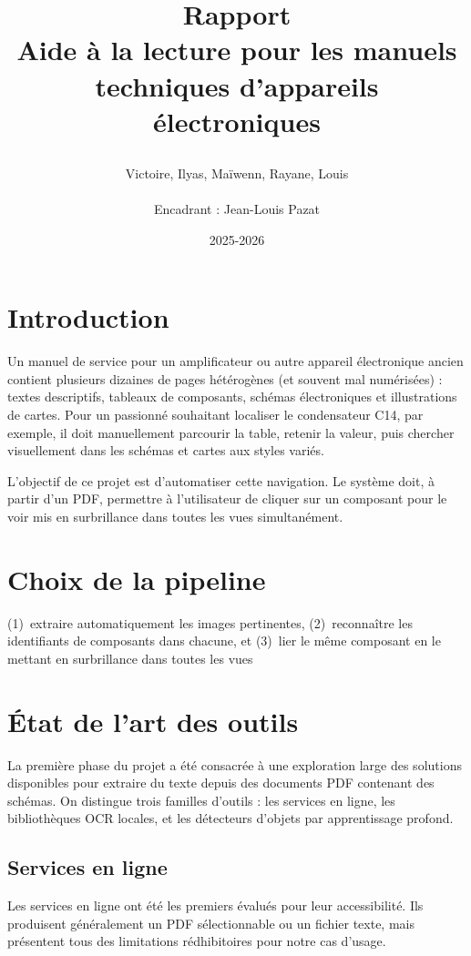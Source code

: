 \documentclass[a4paper,11pt]{article} %
\title{
\begin{center}
{\Huge \textbf{Rapport}} \\[1cm]
{\textbf{} Aide à la lecture pour les manuels techniques d'appareils électroniques}
\end{center}
}
\author{Victoire, Ilyas, Ma\"iwenn, Rayane, Louis 
  \\ \\
  Encadrant : Jean-Louis Pazat}
\date{2025-2026}
\begin{document}
\maketitle

\section*{Introduction}

Un manuel de service pour un amplificateur ou autre appareil électronique ancien contient 
plusieurs dizaines de pages hétérogènes (et souvent mal numérisées) : textes descriptifs, tableaux de composants, 
schémas électroniques et illustrations de cartes.
Pour un passionné souhaitant localiser le condensateur C14, par exemple, il doit
manuellement parcourir la table, retenir la valeur, puis chercher visuellement dans les
schémas et cartes aux styles variés.

L'objectif de ce projet est d'automatiser cette navigation.
Le système doit, à partir d'un PDF, permettre à l'utilisateur de cliquer sur un composant pour le voir mis en surbrillance
dans toutes les vues simultanément.

\section{Choix de la pipeline}
(1)~extraire automatiquement les images pertinentes,
(2)~reconnaître les identifiants de composants dans chacune, et
(3)~lier le même composant en le mettant en surbrillance dans toutes les vues

\section{État de l'art des outils}

La première phase du projet a été consacrée à une exploration large des solutions
disponibles pour extraire du texte depuis des documents PDF contenant des schémas.
On distingue trois familles d'outils : les services en ligne, les bibliothèques OCR
locales, et les détecteurs d'objets par apprentissage profond.

\subsection{Services en ligne}

Les services en ligne ont été les premiers évalués pour leur accessibilité.
Ils produisent généralement un PDF sélectionnable ou un fichier texte, mais présentent
tous des limitations rédhibitoires pour notre cas d'usage.
\end{document}
